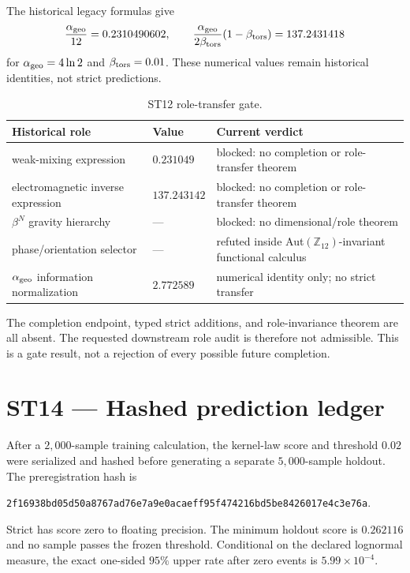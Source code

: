\documentclass[11pt,a4paper]{article}
\begin{document}
The historical legacy formulas give
\[
\frac{\alpha_{\rm geo}}{12}=0.2310490602,\qquad
\frac{\alpha_{\rm geo}}{2\beta_{\rm tors}}(1-\beta_{\rm tors})=137.2431418
\]
for $\alpha_{\rm geo}=4\ln2$ and $\beta_{\rm tors}=0.01$. These numerical values remain historical identities, not strict predictions.

\begin{table}[H]
\centering
\small
\caption{ST12 role-transfer gate.}
\begin{tabularx}{\textwidth}{@{}p{}p{}X@{}}
\toprule
Historical role & Value & Current verdict\\
\midrule
weak-mixing expression & $0.231049$ & blocked: no completion or role-transfer theorem\\
electromagnetic inverse expression & $137.243142$ & blocked: no completion or role-transfer theorem\\
$\beta^N$ gravity hierarchy & --- & blocked: no dimensional/role theorem\\
phase/orientation selector & --- & refuted inside Aut$(\mathbb Z_{12})$-invariant functional calculus\\
$\alpha_{\rm geo}$ information normalization & $2.772589$ & numerical identity only; no strict transfer\\
\bottomrule
\end{tabularx}
\normalsize
\end{table}

The completion endpoint, typed strict additions, and role-invariance theorem are all absent. The requested downstream role audit is therefore not admissible. This is a gate result, not a rejection of every possible future completion.

\section{ST14 --- Hashed prediction ledger}

After a $2{,}000$-sample training calculation, the kernel-law score and threshold $0.02$ were serialized and hashed before generating a separate $5{,}000$-sample holdout. The preregistration hash is
\begin{center}
\texttt{2f16938bd05d50a8767ad76e7a9e0acaeff95f474216bd5be8426017e4c3e76a}.
\end{center}
Strict has score zero to floating precision. The minimum holdout score is $0.262116$ and no sample passes the frozen threshold. Conditional on the declared lognormal measure, the exact one-sided $95\%$ upper rate after zero events is $5.99\times10^{-4}$.
\end{document}
